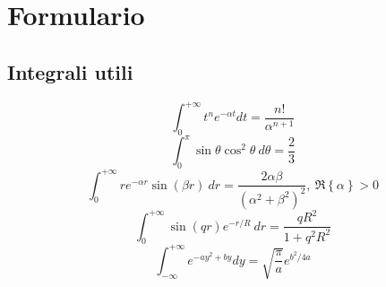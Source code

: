 \documentclass[11pt, a4paper]{scrartcl} %
\numberwithin{equation}{subsection}
\theoremstyle{style2}
\theoremstyle{style1}
\begin{document}
\newpage
\section{Formulario}

\subsection{Integrali utili}

\begin{equation}\label{solint1}
\int_{0} ^{+\infty} t^n e^{-\alpha t} dt = \frac{n!}{\alpha ^{n+1} }
\end{equation}
\begin{equation}\label{solint2}
	\int_{0} ^\pi \sin \theta \cos ^2 \theta  \ d\theta  = \frac{2}{3}
\end{equation}
\begin{equation}\label{solint3}
	\int_{0} ^{+\infty} r e^{- \alpha  r}  \sin (\beta r)\ dr = \frac{2 \alpha  \beta }{(\alpha ^2 + \beta ^2)^2}, \ \Re \left\{ \alpha  \right\} >0
\end{equation}
\begin{equation}\label{solint4}
	\int_{0} ^{+\infty} \sin(qr) e^{-r / R} \ dr = \frac{qR^2}{1 + q^2 R^2}
\end{equation}
\begin{equation}
	\label{solint5}
	\int_{-\infty} ^{+\infty} e^{-a y^2 + by}  dy = \sqrt{\frac{\pi}{a}} e^{b^2 / 4 a} 
\end{equation}
\end{document}
